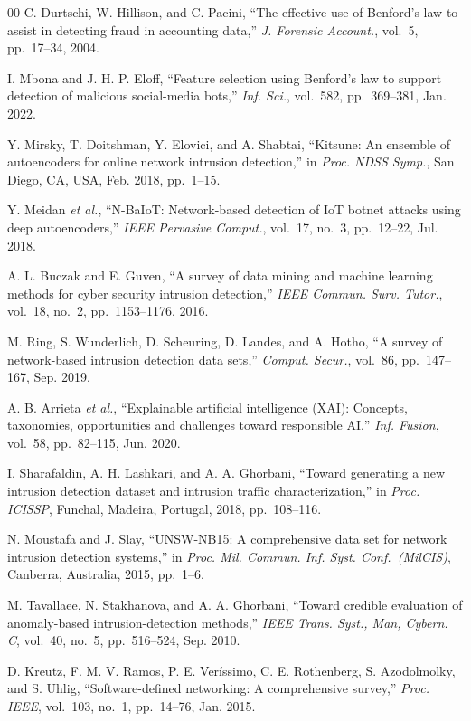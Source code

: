 \documentclass[conference]{IEEEtran}
\begin{document}
\begin{thebibliography}{00}
C. Durtschi, W. Hillison, and C. Pacini,
``The effective use of Benford's law to assist in detecting fraud in
accounting data,''
\textit{J. Forensic Account.}, vol.~5, pp.~17--34, 2004.

I. Mbona and J. H. P. Eloff,
``Feature selection using Benford's law to support detection of malicious
social-media bots,''
\textit{Inf. Sci.}, vol.~582, pp.~369--381, Jan. 2022.

Y. Mirsky, T. Doitshman, Y. Elovici, and A. Shabtai,
``Kitsune: An ensemble of autoencoders for online network intrusion
detection,''
in \textit{Proc. NDSS Symp.}, San Diego, CA, USA, Feb. 2018, pp.~1--15.

Y. Meidan \textit{et al.},
``N-BaIoT: Network-based detection of IoT botnet attacks using deep
autoencoders,''
\textit{IEEE Pervasive Comput.}, vol.~17, no.~3, pp.~12--22, Jul. 2018.

A. L. Buczak and E. Guven,
``A survey of data mining and machine learning methods for cyber security
intrusion detection,''
\textit{IEEE Commun. Surv. Tutor.}, vol.~18, no.~2, pp.~1153--1176, 2016.

M. Ring, S. Wunderlich, D. Scheuring, D. Landes, and A. Hotho,
``A survey of network-based intrusion detection data sets,''
\textit{Comput. Secur.}, vol.~86, pp.~147--167, Sep. 2019.

A. B. Arrieta \textit{et al.},
``Explainable artificial intelligence (XAI): Concepts, taxonomies,
opportunities and challenges toward responsible AI,''
\textit{Inf. Fusion}, vol.~58, pp.~82--115, Jun. 2020.

I. Sharafaldin, A. H. Lashkari, and A. A. Ghorbani,
``Toward generating a new intrusion detection dataset and intrusion traffic
characterization,''
in \textit{Proc. ICISSP}, Funchal, Madeira, Portugal, 2018, pp.~108--116.

N. Moustafa and J. Slay,
``UNSW-NB15: A comprehensive data set for network intrusion detection
systems,''
in \textit{Proc. Mil. Commun. Inf. Syst. Conf.\ (MilCIS)},
Canberra, Australia, 2015, pp.~1--6.

M. Tavallaee, N. Stakhanova, and A. A. Ghorbani,
``Toward credible evaluation of anomaly-based intrusion-detection methods,''
\textit{IEEE Trans. Syst., Man, Cybern. C}, vol.~40, no.~5, pp.~516--524,
Sep. 2010.

D. Kreutz, F. M. V. Ramos, P. E. Ver\'{i}ssimo, C. E. Rothenberg,
S. Azodolmolky, and S. Uhlig,
``Software-defined networking: A comprehensive survey,''
\textit{Proc. IEEE}, vol.~103, no.~1, pp.~14--76, Jan. 2015.


\end{thebibliography}
\end{document}
